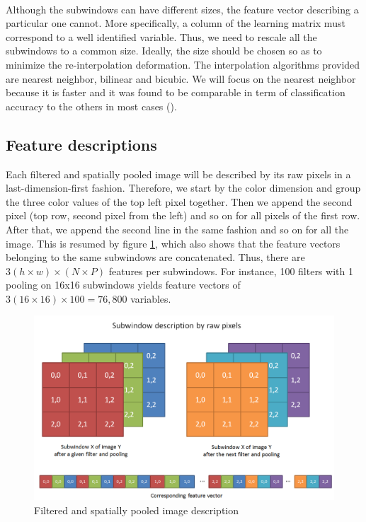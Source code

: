 \documentclass[a4paper]{report}
\begin{document}
		\paragraph{}
		Although the subwindows can have different sizes, the feature vector describing a particular one cannot. More specifically, a column of the learning matrix must correspond to a well identified variable. Thus, we need to rescale all the subwindows to a common size. Ideally, the size should be chosen so as to minimize the re-interpolation deformation. The interpolation algorithms provided are nearest neighbor, bilinear and bicubic. We will focus on the nearest neighbor because it is faster and it was found to be comparable in term of classification accuracy to the others in most cases (\cite{base}).
		
		\subsection{Feature descriptions}		
		Each filtered and spatially pooled image will be described by its raw pixels in a last-dimension-first fashion. Therefore, we start by the color dimension and group the three color values of the top left pixel together. Then we append the second pixel (top row, second pixel from the left) and so on for all pixels of the first row. After that, we append the second line in the same fashion and so on for all the image. This is resumed by figure \ref{fig:imgDesc}, which also shows that the feature vectors belonging to the same subwindows are concatenated.
		Thus, there are $3(h \times w) \times (N \times P)$ features per subwindows. For instance, 100 filters with 1 pooling on 16x16 subwindows yields feature vectors of $3(16 \times 16) \times 100 = 76,800$ variables.
		
	\begin{figure}
		\centering
			\includegraphics[width=1.0\textwidth]{images/imgDesc.png}
		\caption{\label{fig:imgDesc}Filtered and spatially pooled image description}
	\end{figure}
	
\end{document}
